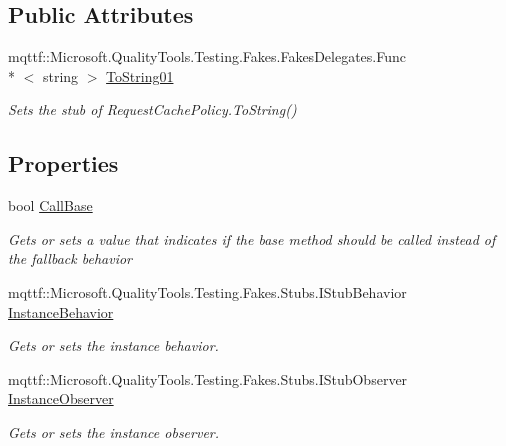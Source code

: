 \subsection*{Public Attributes}
\begin{DoxyCompactItemize}
\item 
mqttf\-::\-Microsoft.\-Quality\-Tools.\-Testing.\-Fakes.\-Fakes\-Delegates.\-Func\\*
$<$ string $>$ \hyperlink{class_system_1_1_net_1_1_cache_1_1_fakes_1_1_stub_request_cache_policy_a2bf0f6564f660c48b297def65042a11d}{To\-String01}
\begin{DoxyCompactList}\small\item\em Sets the stub of Request\-Cache\-Policy.\-To\-String()\end{DoxyCompactList}\end{DoxyCompactItemize}
\subsection*{Properties}
\begin{DoxyCompactItemize}
\item 
bool \hyperlink{class_system_1_1_net_1_1_cache_1_1_fakes_1_1_stub_request_cache_policy_acad3b59b427a363bd235a38333d11c95}{Call\-Base}
\begin{DoxyCompactList}\small\item\em Gets or sets a value that indicates if the base method should be called instead of the fallback behavior\end{DoxyCompactList}\item 
mqttf\-::\-Microsoft.\-Quality\-Tools.\-Testing.\-Fakes.\-Stubs.\-I\-Stub\-Behavior \hyperlink{class_system_1_1_net_1_1_cache_1_1_fakes_1_1_stub_request_cache_policy_a073d2ec5f365de34b274bc60d385ffe1}{Instance\-Behavior}
\begin{DoxyCompactList}\small\item\em Gets or sets the instance behavior.\end{DoxyCompactList}\item 
mqttf\-::\-Microsoft.\-Quality\-Tools.\-Testing.\-Fakes.\-Stubs.\-I\-Stub\-Observer \hyperlink{class_system_1_1_net_1_1_cache_1_1_fakes_1_1_stub_request_cache_policy_a3b325ea2deae2a7ae28b27f943ae6864}{Instance\-Observer}
\begin{DoxyCompactList}\small\item\em Gets or sets the instance observer.\end{DoxyCompactList}\end{DoxyCompactItemize}


